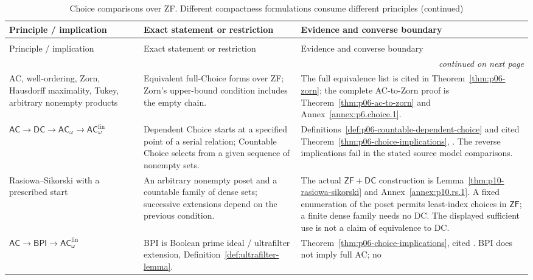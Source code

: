 \begingroup\small
\begin{longtable}{@{}p{}p{}p{}@{}}
\caption{Choice comparisons over ZF. Different compactness formulations
consume different principles.}
\label{tab:p14-strength-choice}\\
\toprule
Principle / implication & Exact statement or restriction & Evidence and converse boundary \\
\midrule
\endfirsthead
\caption[]{Choice comparisons over ZF. Different compactness formulations
consume different principles (continued)}\\
\toprule
Principle / implication & Exact statement or restriction & Evidence and converse boundary \\
\midrule
\endhead
\midrule\multicolumn{3}{r}{\emph{continued on next page}}\\
\endfoot
\endlastfoot
AC, well-ordering, Zorn, Hausdorff maximality, Tukey, arbitrary nonempty
products & Equivalent full-Choice forms over ZF; Zorn's upper-bound condition
includes the empty chain. &
The full equivalence list is cited in Theorem~\ref{thm:p06-zorn}; the complete
AC-to-Zorn proof is Theorem~\ref{thm:p06-ac-to-zorn} and
Annex~\ref{annex:p6.choice.1}. \\
\addlinespace
\(\mathsf{AC}\to\mathsf{DC}\to\mathsf{AC}_\omega
\to\mathsf{AC}_\omega^{\mathrm{fin}}\) &
Dependent Choice starts at a specified point of a serial relation; Countable
Choice selects from a given sequence of nonempty sets. &
Definitions~\ref{def:p06-countable-dependent-choice} and cited
Theorem~\ref{thm:p06-choice-implications}, \cite{HowardRubin1998}.
The reverse implications fail in the stated source model comparisons. \\
\addlinespace
Rasiowa--Sikorski with a prescribed start & An arbitrary nonempty poset
and a countable family of dense sets; successive extensions depend on
the previous condition. & The actual \(\mathsf{ZF}+\mathsf{DC}\)
construction is Lemma~\ref{thm:p10-rasiowa-sikorski} and
Annex~\ref{annex:p10.rs.1}. A fixed enumeration of the poset permits
least-index choices in \(\mathsf{ZF}\); a finite dense family needs
no DC. The displayed sufficient use is not a claim of equivalence to DC. \\
\addlinespace
\(\mathsf{AC}\to\mathsf{BPI}\to
\mathsf{AC}_\omega^{\mathrm{fin}}\) & BPI is Boolean prime ideal /
ultrafilter extension, Definition~\ref{def:ultrafilter-lemma}. &
Theorem~\ref{thm:p06-choice-implications}, cited
\cite{HowardRubin1998,HalpernLevy1971}. BPI does not imply full AC; no

\end{longtable}
